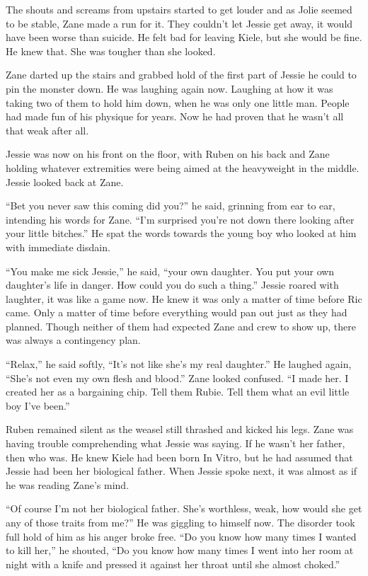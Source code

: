 The shouts and screams from upstairs started to get louder and as Jolie seemed to be stable, Zane made a run for it.  They couldn't let Jessie get away, it would have been worse than suicide.  He felt bad for leaving Kiele, but she would be fine.  He knew that.  She was tougher than she looked.  

Zane darted up the stairs and grabbed hold of the first part of Jessie he could to pin the monster down.  He was laughing again now.  Laughing at how it was taking two of them to hold him down, when he was only one little man.  People had made fun of his physique for years.  Now he had proven that he wasn't all that weak after all.

Jessie was now on his front on the floor, with Ruben on his back and Zane holding whatever extremities were being aimed at the heavyweight in the middle.  Jessie looked back at Zane.  

``Bet you never saw this coming did you?'' he said, grinning from ear to ear, intending his words for Zane.  ``I'm surprised you're not down there looking after your little bitches.''  He spat the words towards the young boy who looked at him with immediate disdain.

``You make me sick Jessie,'' he said, ``your own daughter.  You put your own daughter's life in danger.  How could you do such a thing.''  Jessie roared with laughter, it was like a game now.  He knew it was only a matter of time before Ric came.  Only a matter of time before everything would pan out just as they had planned.  Though neither of them had expected Zane and crew to show up, there was always a contingency plan.

``Relax,'' he said softly, ``It's not like she's my real daughter.''  He laughed again, ``She's not even my own flesh and blood.''  Zane looked confused.  ``I made her.  I created her as a bargaining chip.  Tell them Rubie.  Tell them what an evil little boy I've been.''

Ruben remained silent as the weasel still thrashed and kicked his legs.  Zane was having trouble comprehending what Jessie was saying.  If he wasn't her father, then who was.  He knew Kiele had been born In Vitro, but he had assumed that Jessie had been her biological father.  When Jessie spoke next, it was almost as if he was reading Zane's mind.

``Of course I'm not her biological father.  She's worthless, weak, how would she get any of those traits from me?''  He was giggling to himself now.  The disorder took full hold of him as his anger broke free.  ``Do you know how many times I wanted to kill her,'' he shouted, ``Do you know how many times I went into her room at night with a knife and pressed it against her throat until she almost choked.''

